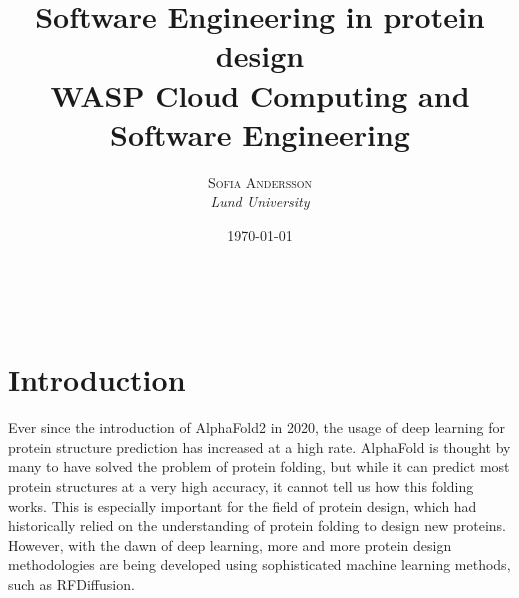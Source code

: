 \documentclass[a4paper, 11pt]{article} %
\title{\textbf{Software Engineering in protein design}\\ %
WASP Cloud Computing and Software Engineering} %
\author{\textsc{Sofia Andersson} %
\\{\textit{Lund University}}} %
\date{\today} %
\makeatletter
\renewcommand{\maketitle}{ %
\begin{flushright} %
{\LARGE\@title} %

\vspace{50pt} %

{\large\@author} %
\\\@date %

\vspace{40pt} %
\end{flushright}
}
\makeatother
\begin{document}
\maketitle %







\section*{Introduction}

Ever since the introduction of AlphaFold2 in 2020, the usage of deep learning for protein structure prediction has increased at a high rate\cite{jumperHighlyAccurateProtein2021}. AlphaFold is thought by many to have solved the problem of protein folding, but while it can predict most protein structures at a very high accuracy, it cannot tell us how this folding works. This is especially important for the field of protein design, which had historically relied on the understanding of protein folding to design new proteins. However, with the dawn of deep learning, more and more protein design methodologies are being developed using sophisticated machine learning methods, such as RFDiffusion\cite*{watsonBroadlyApplicableAccurate2022}. 
\end{document}

